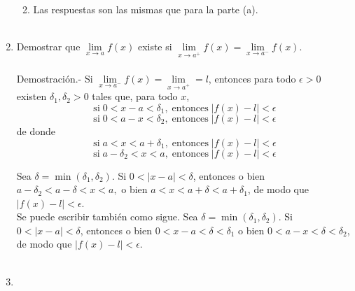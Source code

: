 \begin{enumerate}
\begin{enumerate}[\bfseries (a)]
\begin{enumerate}[\bfseries (i)]
\end{enumerate}

    \item Las respuestas son las mismas que para la parte (a).\\\\

\end{enumerate}

\item Demostrar que $\lim\limits_{x\to a} f(x)$ existe si $\lim\limits_{x\to a^+} f(x) = \lim\limits_{x\to a^-} f(x)$.\\\\
    Demostración.-\; Si $\lim\limits_{x\to a^-}f(x) = \lim\limits_{x\to a^+} = l$, entonces para todo $\epsilon>0$ existen $\delta_1,\delta_2 >0$ tales que, para todo $x$, $$\mbox{si}\; 0<x-a<\delta_1, \; \mbox{entonces}\; |f(x)-l|<\epsilon$$  $$\mbox{si}\; 0 <a-x<\delta_2, \; \mbox{entonces}\; |f(x)-l|<\epsilon$$
    de donde 
    $$\mbox{si}\; a<x<a+\delta_1, \; \mbox{entonces}\; |f(x)-l|<\epsilon$$  $$\mbox{si}\; a-\delta_2 <x<a, \; \mbox{entonces}\; |f(x)-l|<\epsilon$$

    Sea $\delta=\min(\delta_1,\delta_2).$ Si $0<|x-a|<\delta$, entonces o bien $a-\delta_2<a-\delta<x<a,$ o bien $a<x<a+\delta<a+\delta_1$, de modo que $|f(x)-l|<\epsilon$.\\
    Se puede escribir también como sigue. Sea $\delta=\min(\delta_1,\delta_2).$ Si $0<|x-a|<\delta$, entonces o bien $0<x-a<\delta < \delta_1$ o bien $0<a-x<\delta<\delta_2$, de modo que $|f(x)-l|<\epsilon$.\\\\


\item 

\end{enumerate}

